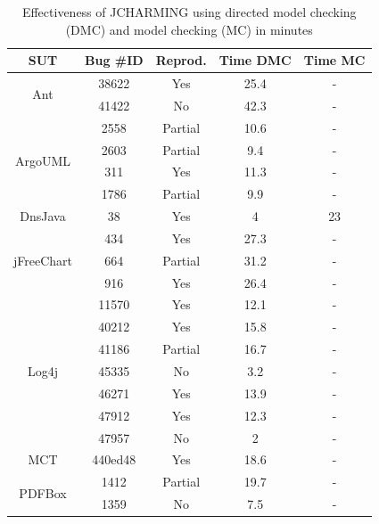 \documentclass[times]{smrauth}
\begin{document}
\begin{table}[h!]
\centering
\caption{Effectiveness of JCHARMING using directed model checking (DMC) and model checking (MC) in minutes}
\begin{tabular}{c|c|c|c|c}
SUT                         & Bug \#ID & Reprod. & Time DMC & Time MC \\ \hline \hline
\multirow{2}{*}{Ant}        & 38622    & Yes     & 25.4     & -       \\
                            & 41422    & No      & 42.3     & -       \\ \hline
\multirow{4}{*}{ArgoUML}    & 2558     & Partial & 10.6     & -       \\
                            & 2603     & Partial & 9.4      & -       \\
                            & 311      & Yes     & 11.3     & -       \\
                            & 1786     & Partial & 9.9      & -       \\  \hline
DnsJava                     & 38       & Yes     & 4        & 23      \\ \hline
\multirow{3}{*}{jFreeChart} & 434      & Yes     & 27.3     & -       \\
                            & 664      & Partial & 31.2     & -       \\
                            & 916      & Yes     & 26.4     & -       \\ \hline
\multirow{7}{*}{Log4j}      & 11570    & Yes     & 12.1     & -       \\
                            & 40212    & Yes     & 15.8     & -       \\
                            & 41186    & Partial & 16.7     & -       \\
                            & 45335    & No      & 3.2      & -       \\
                            & 46271    & Yes     & 13.9     & -       \\
                            & 47912    & Yes     & 12.3     & -       \\
                            & 47957    & No      & 2        & -       \\ \hline
MCT                         & 440ed48  & Yes     & 18.6     & -       \\ \hline
\multirow{2}{*}{PDFBox}     & 1412     & Partial & 19.7     & -       \\
                            & 1359     & No      & 7.5        & - \\ \hline

\end{tabular}
\end{table}
\end{document}
